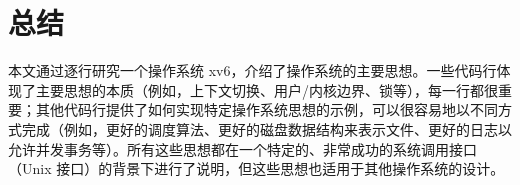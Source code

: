\chapter{总结}
\label{CH:SUM}

本文通过逐行研究一个操作系统 xv6，介绍了操作系统的主要思想。一些代码行体现了主要思想的本质（例如，上下文切换、用户/内核边界、锁等），每一行都很重要；其他代码行提供了如何实现特定操作系统思想的示例，可以很容易地以不同方式完成（例如，更好的调度算法、更好的磁盘数据结构来表示文件、更好的日志以允许并发事务等）。所有这些思想都在一个特定的、非常成功的系统调用接口（Unix 接口）的背景下进行了说明，但这些思想也适用于其他操作系统的设计。

